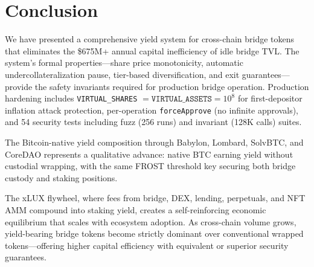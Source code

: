 \section{Conclusion}
\label{sec:conclusion}

We have presented a comprehensive yield system for cross-chain bridge tokens that eliminates the \$675M+ annual capital inefficiency of idle bridge TVL. The system's formal properties---share price monotonicity, automatic undercollateralization pause, tier-based diversification, and exit guarantees---provide the safety invariants required for production bridge operation. Production hardening includes \texttt{VIRTUAL\_SHARES} $= \texttt{VIRTUAL\_ASSETS} = 10^8$ for first-depositor inflation attack protection, per-operation \texttt{forceApprove} (no infinite approvals), and 54 security tests including fuzz (256 runs) and invariant (128K calls) suites.

The Bitcoin-native yield composition through Babylon, Lombard, SolvBTC, and CoreDAO represents a qualitative advance: native BTC earning yield without custodial wrapping, with the same FROST threshold key securing both bridge custody and staking positions.

The xLUX flywheel, where fees from bridge, DEX, lending, perpetuals, and NFT AMM compound into staking yield, creates a self-reinforcing economic equilibrium that scales with ecosystem adoption. As cross-chain volume grows, yield-bearing bridge tokens become strictly dominant over conventional wrapped tokens---offering higher capital efficiency with equivalent or superior security guarantees.

